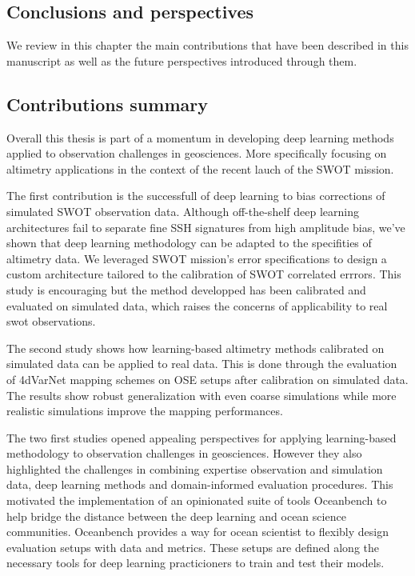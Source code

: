 \begin{bibunit}

\chapter*{Conclusions and perspectives}
\label{chap:conclusions}

We review in this chapter the main contributions that have been described in this manuscript as well as the future perspectives introduced through them.

\section*{Contributions summary}
Overall this thesis is part of a momentum in developing deep learning methods applied to observation challenges in geosciences.
More specifically focusing on altimetry applications in the context of the recent lauch of the SWOT mission.

The first contribution is the successfull of deep learning to bias corrections of simulated SWOT observation data.
Although off-the-shelf deep learning architectures fail to separate fine SSH signatures from high amplitude bias, we've shown that deep learning methodology can be adapted to the specifities of altimetry data.
We leveraged SWOT mission's error specifications to design a custom architecture tailored to the calibration of SWOT correlated errrors.
This study is encouraging but the method developped has been calibrated and evaluated on simulated data, which raises the concerns of applicability to real swot observations.

The second study shows how learning-based altimetry methods calibrated on simulated data can be applied to real data.
This is done through the evaluation of 4dVarNet mapping schemes on OSE setups after calibration on simulated data. 
The results show robust generalization with even coarse simulations while more realistic simulations improve the mapping performances.

The two first studies opened appealing perspectives for applying learning-based methodology to observation challenges in geosciences.
However they also highlighted the challenges in combining expertise  observation and simulation data, deep learning methods and domain-informed evaluation procedures.
This motivated the implementation of an opinionated suite of tools Oceanbench to help bridge the distance between the deep learning and ocean science communities.
Oceanbench provides a way for ocean scientist to flexibly design evaluation setups with data and metrics. These setups are defined along the necessary tools for deep learning practicioners to train and test their models.



\end{bibunit}
